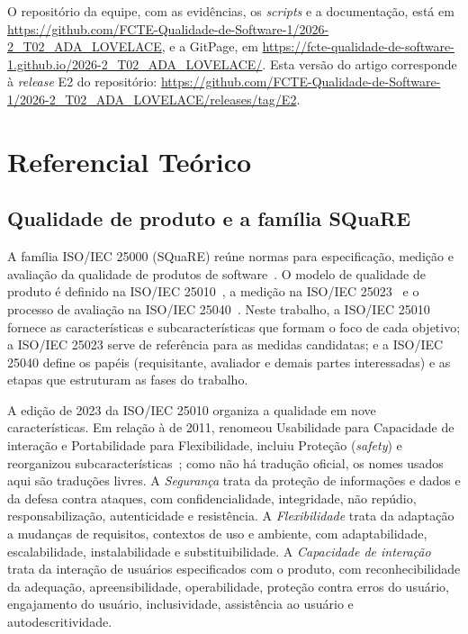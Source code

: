 \documentclass[conference]{IEEEtran}
\newcommand{\release}{E2}
\newcommand{\repourl}{\url{https://github.com/FCTE-Qualidade-de-Software-1/2026-2_T02_ADA_LOVELACE}}
\newcommand{\releaseurl}{\url{https://github.com/FCTE-Qualidade-de-Software-1/2026-2_T02_ADA_LOVELACE/releases/tag/E2}}
\newcommand{\gitpageurl}{\url{https://fcte-qualidade-de-software-1.github.io/2026-2_T02_ADA_LOVELACE/}}
\begin{document}
{\raggedright
O repositório da equipe, com as evidências, os \textit{scripts} e a
documentação, está em \repourl, e a GitPage, em \gitpageurl. Esta versão do
artigo corresponde à \textit{release} \release{} do repositório:
\releaseurl.\par}

\section{Referencial Teórico}
\label{sec:ref}

\subsection{Qualidade de produto e a família SQuaRE}
A família ISO/IEC 25000 (SQuaRE) reúne normas para especificação, medição e
avaliação da qualidade de produtos de software~\cite{iso25000}. O modelo de
qualidade de produto é definido na ISO/IEC 25010~\cite{iso25010}, a medição
na ISO/IEC 25023~\cite{iso25023} e o processo de avaliação na
ISO/IEC 25040~\cite{iso25040}. Neste trabalho, a ISO/IEC 25010 fornece as
características e subcaracterísticas que formam o foco de cada objetivo; a
ISO/IEC 25023 serve de referência para as medidas candidatas; e a
ISO/IEC 25040 define os papéis (requisitante, avaliador e demais partes
interessadas) e as etapas que estruturam as fases do trabalho.

A edição de 2023 da ISO/IEC 25010 organiza a qualidade em nove
características. Em relação à de 2011, renomeou Usabilidade para Capacidade
de interação e Portabilidade para Flexibilidade, incluiu Proteção
(\textit{safety}) e reorganizou subcaracterísticas~\cite{iso25010}; como não
há tradução oficial, os nomes usados aqui são traduções livres. A
\textit{Segurança} trata da proteção de informações e dados e da defesa
contra ataques, com confidencialidade, integridade, não repúdio,
responsabilização, autenticidade e resistência. A \textit{Flexibilidade}
trata da adaptação a mudanças de requisitos, contextos de uso e ambiente, com
adaptabilidade, escalabilidade, instalabilidade e substituibilidade. A
\textit{Capacidade de interação} trata da interação de usuários
especificados com o produto, com reconhecibilidade da adequação,
apreensibilidade, operabilidade, proteção contra erros do usuário,
engajamento do usuário, inclusividade, assistência ao usuário e
autodescritividade.
\end{document}
